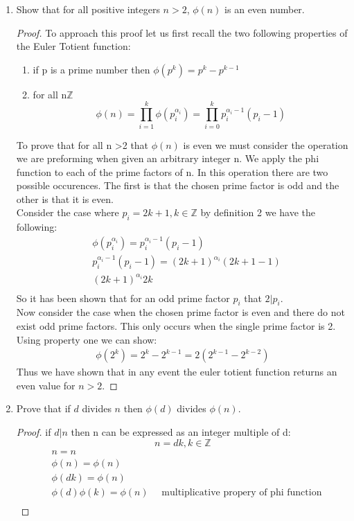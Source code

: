 \documentclass[11pt]{article}
\theoremstyle{definition}  %
\newcommand{\Z}{\mathbb{Z}}
\begin{document}
\begin{enumerate}
\begin{proof}
This means that d=gcd(b,r) and d=gcd(a,b) by definition so we arrive to the final conclusion that:
\[
  gcd(b,r)=gcd(a,b)
\]
\end{proof}
\item Show that for all positive integers $n > 2$, $\phi(n)$ is an even number.
\begin{proof}
To approach this proof let us first recall the two following properties of the Euler Totient function:
\begin{enumerate}
  \item if p is a prime number then $\phi(p^k)=p^k-p^{k-1}$
  \item for all n$\Z$\[
  \phi(n)=\prod_{i=1}^k\phi(p_i^{\alpha_i})=\prod_{i=0}^kp_i^{\alpha_i-1}(p_i-1)
\]
\end{enumerate}
To prove that for all n >2 that $\phi(n)$ is even we must consider the operation we are preforming when given an arbitrary integer n. We apply the phi function to each of the prime factors of n. In this operation there are two possible occurences. The first is that the chosen prime factor is odd and the other is that it is even. \\
Consider the case where $p_i=2k+1, k\in \Z$ by definition 2 we have the following:
\begin{align*}
  &\phi(p_i^{\alpha_i})=p_i^{\alpha_i-1}(p_i-1)\\
  &p_i^{\alpha_i-1}(p_i-1)=(2k+1)^{\alpha_i}(2k+1-1)\\
  &(2k+1)^{\alpha_i}2k\\
\end{align*}
So it has been shown that for an odd prime factor $p_i$ that $2|p_i$.\\
Now consider the case when the chosen prime factor is even and there do not exist odd prime factors. This only occurs when the single prime factor is 2. Using property one we can show: \begin{align*}
  \phi(2^k)=2^k-2^{k-1}=2(2^{k-1}-2^{k-2})
\end{align*}
Thus we have shown that in any event the euler totient function returns an even value for $n> 2$.
\end{proof}

\item Prove that if $d$ divides $n$ then $\phi(d)$ divides $\phi(n)$.
\begin{proof}
if $d|n$ then n can be expressed as an integer multiple of d:
\[
  n=dk,k\in \Z
\]
\begin{align*}
  &n=n\\
  &\phi(n)=\phi(n)\\
  &\phi(dk)=\phi(n)\\
    &\phi(d)\phi(k)=\phi(n)\quad \text{ multiplicative propery of phi function}\\
\end{align*}


\end{proof}
\end{enumerate}
\end{document}
